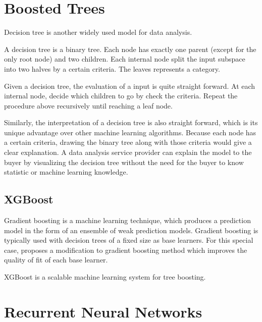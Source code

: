\section{Boosted Trees}

        Decision tree is another widely used model for data analysis.

        A decision tree is a binary tree.
        Each node has exactly one parent (except for the only root node) and two children.
        Each internal node split the input subspace into two halves by a certain criteria.
        The leaves represents a category.

        Given a decision tree, the evaluation of a input is quite straight forward.
        At each internal node, decide which children to go by check the criteria.
        Repeat the procedure above recursively until reaching a leaf node.

        Similarly, the interpretation of a decision tree is also straight forward,
        which is its unique advantage over other machine learning algorithms.
        Because each node has a certain criteria,
        drawing the binary tree along with those criteria would give a clear explanation.
        A data analysis service provider can explain the model to the buyer by visualizing
        the decision tree without the need for the buyer to know statistic or machine learning knowledge.

    \subsection{XGBoost}

        Gradient boosting is a machine learning technique,
        which produces a prediction model in the form of an ensemble of weak prediction models.
        Gradient boosting is typically used with decision trees of a fixed size as base learners.
        For this special case, \cite{Friedman2001} proposes a modification to gradient boosting method
        which improves the quality of fit of each base learner.

        XGBoost is a scalable machine learning system for tree boosting. \cite{Chen2016}


\section{Recurrent Neural Networks}

